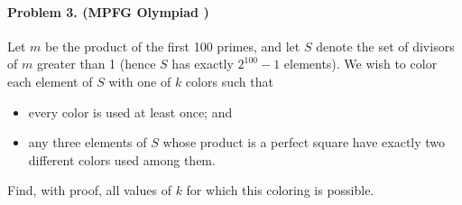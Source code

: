 \documentclass[12pt]{article}
\begin{document}
\paragraph{\textbf{Problem 3. (MPFG Olympiad )}} Let $m$ be the product of the first 100 primes, and let $S$ denote the set of divisors of $m$ greater than 1 (hence $S$ has exactly $2^{100} - 1$ elements). We wish to color each element of $S$ with one of $k$ colors such that
\begin{itemize}
    \item every color is used at least once; and
    \item any three elements of $S$ whose product is a perfect square have exactly two different colors used among them.
\end{itemize}
Find, with proof, all values of $k$ for which this coloring is possible.
\end{document}
